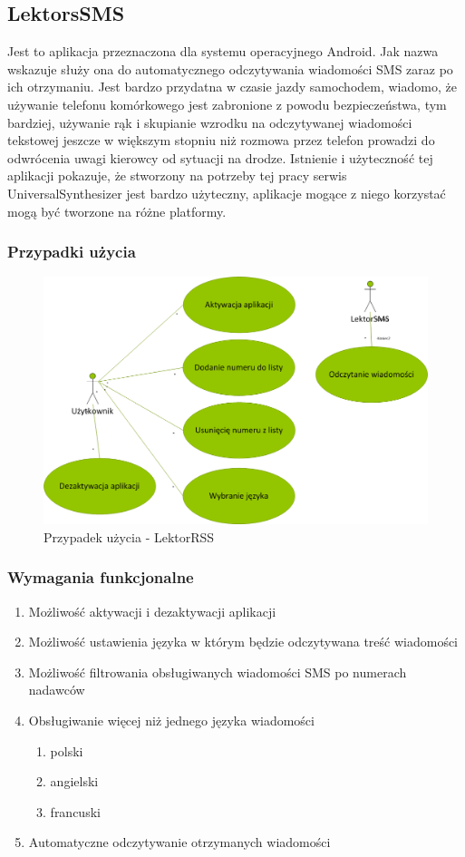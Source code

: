 \subsection{LektorsSMS}
Jest to aplikacja przeznaczona dla systemu operacyjnego Android. Jak nazwa wskazuje służy ona do automatycznego odczytywania wiadomości SMS zaraz po ich otrzymaniu. Jest bardzo przydatna w czasie jazdy samochodem, wiadomo, że używanie telefonu komórkowego jest zabronione z powodu bezpieczeństwa, tym bardziej, używanie rąk i skupianie wzrodku na odczytywanej wiadomości tekstowej jeszcze w większym stopniu niż rozmowa przez telefon prowadzi do odwrócenia uwagi kierowcy od sytuacji na drodze. Istnienie i użyteczność tej aplikacji pokazuje, że stworzony na potrzeby tej pracy serwis UniversalSynthesizer jest bardzo użyteczny, aplikacje mogące z niego korzystać mogą być tworzone na różne platformy.
\newpage
\subsubsection{Przypadki użycia}
\begin{figure}[!h]
	\centering
	\includegraphics[scale=0.45]{useCaseLektorSMS.png} 
	\caption{Przypadek użycia - LektorRSS}
\end{figure}

\subsubsection{Wymagania funkcjonalne}
\begin{enumerate}
	\item Możliwość aktywacji i dezaktywacji aplikacji
	\item Możliwość ustawienia języka w którym będzie odczytywana treść wiadomości
	\item Możliwość filtrowania obsługiwanych wiadomości SMS po numerach nadawców 
	\item Obsługiwanie więcej niż jednego języka wiadomości
		\begin{enumerate}
			\item polski
			\item angielski
			\item francuski
		\end{enumerate}
	\item Automatyczne odczytywanie otrzymanych wiadomości
\end{enumerate}

